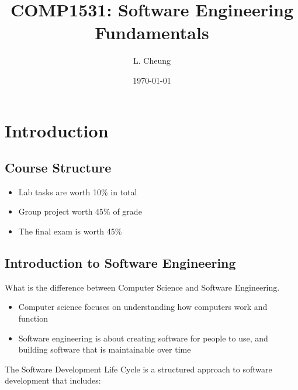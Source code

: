 \documentclass{report}
\title{\textbf{COMP1531: Software Engineering Fundamentals}}
\author{L. Cheung}
\date{\today}
\begin{document}
\maketitle
\newpage
\tableofcontents
\newpage

\chapter{Introduction}

	\section{Course Structure}

		\begin{itemize}
			\item Lab tasks are worth 10\% in total
			\item Group project worth 45\% of grade
			\item The final exam is worth 45\%
		\end{itemize}

	\section{Introduction to Software Engineering}

		What is the difference between Computer Science and Software Engineering.

		\begin{itemize}
			\item Computer science focuses on understanding how computers work and function
			\item Software engineering is about creating software for people to use, and building software that is maintainable over time
		\end{itemize}

		The Software Development Life Cycle is a structured approach to software development that includes:
\end{document}
